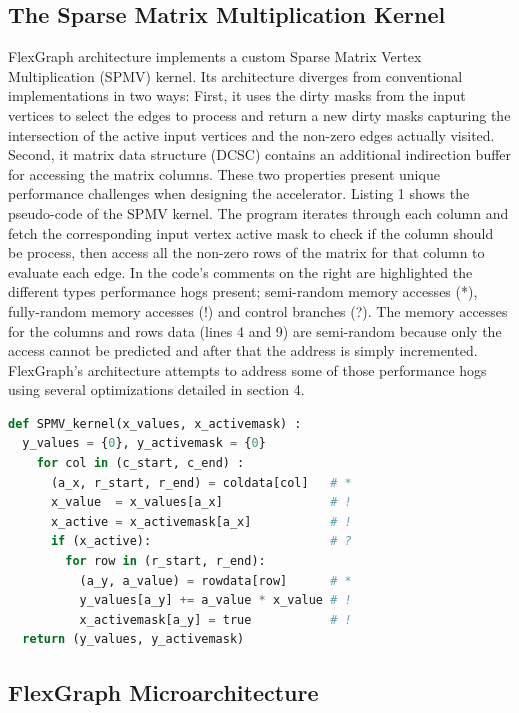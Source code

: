 \subsection{The Sparse Matrix Multiplication Kernel}

FlexGraph architecture implements a custom Sparse Matrix Vertex Multiplication (SPMV) kernel. Its architecture diverges from conventional implementations in two ways: First, it uses the dirty masks from  the input vertices to select the edges to process and return a new dirty masks capturing the intersection of the active input vertices and the non-zero edges actually visited. Second, it matrix data structure (DCSC) contains an additional indirection buffer for accessing the matrix columns. These two properties present unique performance challenges when designing the accelerator. Listing 1 shows the pseudo-code of the SPMV kernel. The program iterates through each column and fetch the corresponding input vertex active mask to check if the column should be process, then access all the non-zero rows of the matrix for that column to evaluate each edge. In the code's comments on the right are highlighted the different types performance hogs present; semi-random memory accesses (*), fully-random memory accesses (!) and control branches (?). The memory accesses for the columns and rows data (lines 4 and 9) are semi-random because only the access cannot be predicted and after that the address is simply incremented. FlexGraph's architecture attempts to address some of those performance hogs using several optimizations detailed in section 4.

\begin{lstlisting}[language=Python, caption=Pseudo-code for SPMV kernel]
def SPMV_kernel(x_values, x_activemask) :
  y_values = {0}, y_activemask = {0}
    for col in (c_start, c_end) :            	
      (a_x, r_start, r_end) = coldata[col]   # *
      x_value  = x_values[a_x]               # !
      x_active = x_activemask[a_x]           # !
      if (x_active):                         # ?
        for row in (r_start, r_end):         
          (a_y, a_value) = rowdata[row]      # *
          y_values[a_y] += a_value * x_value # !
          x_activemask[a_y] = true           # !
  return (y_values, y_activemask)
\end{lstlisting}

\subsection{FlexGraph Microarchitecture}

